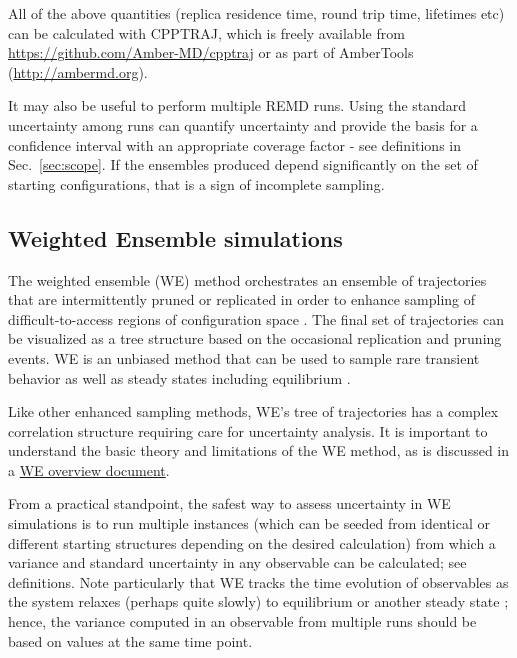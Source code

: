 All of the above quantities (replica residence time, round trip time, lifetimes etc) can be calculated with CPPTRAJ,\citep{Roe2013} which is freely available from \url{https://github.com/Amber-MD/cpptraj} or as part of AmberTools (\url{http://ambermd.org}).

It may also be useful to perform multiple REMD runs.  Using the standard uncertainty among runs can quantify uncertainty and provide the basis for a confidence interval with an appropriate coverage factor - see definitions in Sec.\ \ref{sec:scope}.  If the ensembles produced depend significantly on the set of starting configurations, that is a sign of incomplete sampling.

\subsection{Weighted Ensemble simulations}

The weighted ensemble (WE) method orchestrates an ensemble of trajectories that are intermittently pruned or replicated in order to enhance sampling of difficult-to-access regions of configuration space \cite{Huber-1996}.
The final set of trajectories can be visualized as a tree structure based on the occasional replication and pruning events.
WE is an unbiased method that can be used to sample rare transient behavior \cite{Zhang2010a} as well as steady states \cite{Bhatt2010a} including equilibrium \cite{Suarez2014}.

Like other enhanced sampling methods, WE's tree of trajectories has a complex correlation structure requiring care for uncertainty analysis.
It is important to understand the basic theory and limitations of the WE method, as is discussed in a
\href{https://westpa.github.io/westpa/overview.html}{WE overview document}.

From a practical standpoint, the safest way to assess uncertainty in WE simulations is to run multiple instances (which can be seeded from identical or different starting structures depending on the desired calculation) from which a variance and standard uncertainty in any observable can be calculated; see definitions.
Note particularly that WE tracks the time evolution of observables as the system relaxes (perhaps quite slowly) to equilibrium or another steady state \cite{Zhang2010a}; hence, the variance computed in an observable from multiple runs should be based on values at the same time point.

